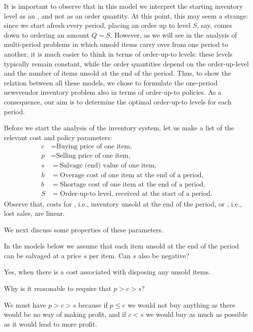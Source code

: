 It is important to observe that in this model we interpret the starting inventory level as an , and not as an order quantity. At this point, this may seem a strange: since we start afresh every period, placing an order up to level $S$, say, comes down to ordering an amount $Q=S$. However, as we will see in the analysis of multi-period problems in which unsold items carry over from one period to another, it is much easier to think in terms of order-up-to levels: these levels typically remain constant, while the order quantities depend on the order-up-level and the number of items unsold at the end of the period. Thus, to show the relation between all these models, we chose to formulate the one-period newsvendor inventory problem also in terms of  order-up-to policies.  As a consequence,  our aim is to  determine the optimal order-up-to levels for each period. 

Before we start the analysis of the inventory system, let us make a list of the relevant cost and policy parameters: 
\begin{align*}
  c &= \text{Buying price of one item,} \\
  p &= \text{Selling  price of one item,} \\
  s &= \text{Salvage (end) value of one item}, \\
  h &= \text{Overage cost of one item at the end of a period},\\
  b &= \text{Shortage cost of one item at the end of a period}, \\
  S &= \text{Order-up-to level, received at the start of a period}.
\end{align*}
Observe that, costs for , i.e., inventory unsold at the end of the period, or , i.e., lost sales, are linear.  

We next discuss some properties of these parameters.
\begin{exercise}
  In the models below we assume that each item unsold at the end of the period can be salvaged  at a price $s$ per item. Can $s$ also be negative?
  \begin{solution}
    Yes, when there is a cost associated with disposing any unsold items. 
  \end{solution}
\end{exercise}

\begin{exercise}
  Why is it reasonable to require that $p > c > s$? 
\begin{solution}
We must have $p>c>s$ because if $p\leq c$ we would not buy anything as there would be no way of making profit, and if $c<s$ we would buy as much as possible as it would lead to more profit. 
\end{solution}
\end{exercise}

